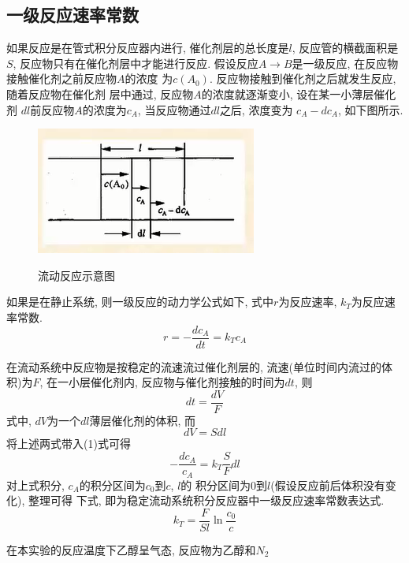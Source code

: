 \documentclass[a4paper]{article}
\begin{document}
\subsection{一级反应速率常数}
如果反应是在管式积分反应器内进行, 催化剂层的总长度是$l$, 
反应管的横截面积是$S$, 反应物只有在催化剂层中才能进行反应. 
假设反应$A\to B$是一级反应, 在反应物接触催化剂之前反应物$A$的浓度
为$c(A_{0})$. 反应物接触到催化剂之后就发生反应, 随着反应物在催化剂
层中通过, 反应物$A$的浓度就逐渐变小, 设在某一小薄层催化剂
$dl$前反应物$A$的浓度为$c_{A}$, 当反应物通过$dl$之后, 浓度变为
$c_{A}-dc_{A}$, 如下图所示.
\begin{figure}[!h]
	\centering
	\includegraphics[width=0.30\paperwidth]{fig/mechanics.png}\\
	\caption{流动反应示意图}
\end{figure}
\par
如果是在静止系统, 则一级反应的动力学公式如下, 式中$r$为反应速率, 
$k_{T}$为反应速率常数.
\begin{equation}
r = -\frac{dc_{A}}{dt} = k_{T}c_{A}
\end{equation}
\par
在流动系统中反应物是按稳定的流速流过催化剂层的, 
流速(单位时间内流过的体积)为$F$, 在一小层催化剂内, 
反应物与催化剂接触的时间为$dt$, 则
\begin{equation}
dt = \frac{dV}{F}
\end{equation}
式中, $dV$为一个$dl$薄层催化剂的体积, 而
\begin{equation}
dV = Sdl
\end{equation}
将上述两式带入(1)式可得
\begin{equation}
-\frac{dc_{A}}{c_{A}}=k_{T}\frac{S}{F}dl
\end{equation}
对上式积分, $c_{A}$的积分区间为$c_{0}$到$c$, $l$的
积分区间为$0$到$l$(假设反应前后体积没有变化), 整理可得
下式, 即为稳定流动系统积分反应器中一级反应速率常数表达式.
\begin{equation}
k_{T} = \frac{F}{Sl}\ln\frac{c_{0}}{c}
\end{equation}
\par
在本实验的反应温度下乙醇呈气态, 反应物为乙醇和$N_{2}$
\end{document}
